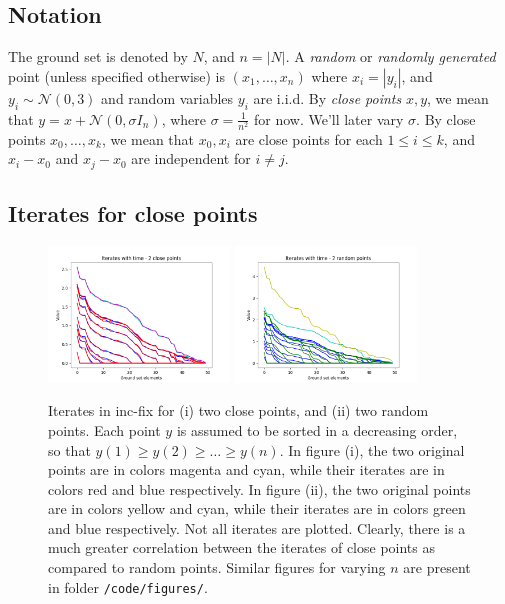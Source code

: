 \documentclass{article}
\begin{document}
\subsection*{Notation}

The ground set is denoted by $N$, and $n = |N|$. A \emph{random} or \emph{randomly generated} point (unless specified otherwise) is $(x_1, \ldots, x_n)$ where $x_i = |y_i|$, and $y_i \sim \mathcal{N}(0, 3)$ and random variables $y_i$ are i.i.d. By \emph{close points} $x, y$, we mean that $y = x + \mathcal{N}(0, \sigma I_n)$, where $\sigma = \frac{1}{n^2}$ for now. We'll later vary $\sigma$. By close points $x_0, \ldots, x_k$, we mean that $x_0, x_i$ are close points for each $1 \le i \le k$, and $x_i - x_0$ and $x_j - x_0$ are independent for $i \neq j$.

\subsection*{Iterates for close points}

\begin{figure}[h]
    \centering
    \includegraphics[width=0.43\textwidth]{code/figures/50-close-points-iterates.png}
    \includegraphics[width=0.43\textwidth]{code/figures/50-random-points-iterates.png}
    \caption{Iterates in inc-fix for (i) two close points, and (ii) two random points. Each point $y$ is assumed to be sorted in a decreasing order, so that $y(1) \geq y(2) \geq \ldots \geq y(n)$. In figure (i), the two original points are in colors magenta and cyan, while their iterates are in colors red and blue respectively. In figure (ii), the two original points are in colors yellow and cyan, while their iterates are in colors green and blue respectively. Not all iterates are plotted. Clearly, there is a much greater correlation between the iterates of close points as compared to random points. Similar figures for varying $n$ are present in folder \texttt{/code/figures/}.}
    \label{fig:iterates-for-close-points}
\end{figure}
\end{document}
